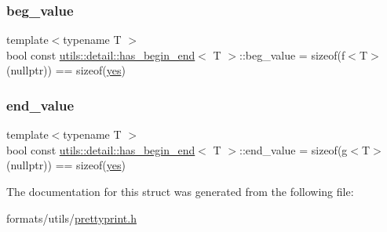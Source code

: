 \subsubsection{\texorpdfstring{beg\_value}{beg\_value}}
{\footnotesize\ttfamily template$<$typename T $>$ \\
bool const \mbox{\hyperlink{structutils_1_1detail_1_1has__begin__end}{utils\+::detail\+::has\+\_\+begin\+\_\+end}}$<$ T $>$\+::beg\+\_\+value = sizeof(f$<$T$>$(nullptr)) == sizeof(\mbox{\hyperlink{structutils_1_1detail_1_1sfinae__base_ad5567f856d8b9af7d1af85c2555ce0e5}{yes}})\hspace{0.3cm}{\ttfamily [static]}}

\mbox{\label{structutils_1_1detail_1_1has__begin__end_ad06063e05c3b604d2207e6c07e473770}} 
\subsubsection{\texorpdfstring{end\_value}{end\_value}}
{\footnotesize\ttfamily template$<$typename T $>$ \\
bool const \mbox{\hyperlink{structutils_1_1detail_1_1has__begin__end}{utils\+::detail\+::has\+\_\+begin\+\_\+end}}$<$ T $>$\+::end\+\_\+value = sizeof(g$<$T$>$(nullptr)) == sizeof(\mbox{\hyperlink{structutils_1_1detail_1_1sfinae__base_ad5567f856d8b9af7d1af85c2555ce0e5}{yes}})\hspace{0.3cm}{\ttfamily [static]}}



The documentation for this struct was generated from the following file\+:\begin{DoxyCompactItemize}
\item 
formats/utils/\mbox{\hyperlink{prettyprint_8h}{prettyprint.\+h}}\end{DoxyCompactItemize}
